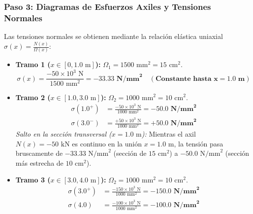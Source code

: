 \subsubsection*{Paso 3: Diagramas de Esfuerzos Axiles y Tensiones Normales}
Las tensiones normales se obtienen mediante la relación elástica uniaxial $\sigma(x) = \frac{N(x)}{\Omega(x)}$:
\begin{itemize}
    \item \textbf{Tramo 1 ($x \in [0, 1.0\text{ m}]$):} $\Omega_1 = 1500\text{ mm}^2 = 15\text{ cm}^2$.
    \begin{equation}
        \sigma(x) = \frac{-50 \times 10^3\text{ N}}{1500\text{ mm}^2} = \mathbf{-33.33\text{ N/mm}^2 \quad (\text{Constante hasta } x=1.0\text{ m})}
    \end{equation}
    \item \textbf{Tramo 2 ($x \in [1.0, 3.0\text{ m}]$):} $\Omega_2 = 1000\text{ mm}^2 = 10\text{ cm}^2$.
    \begin{align}
        \sigma(1.0^+) & = \frac{-50 \times 10^3\text{ N}}{1000\text{ mm}^2} = \mathbf{-50.0\text{ N/mm}^2} \\
        \sigma(3.0^-) & = \frac{+50 \times 10^3\text{ N}}{1000\text{ mm}^2} = \mathbf{+50.0\text{ N/mm}^2}
    \end{align}
    \textit{Salto en la sección transversal ($x = 1.0\text{ m}$):} Mientras el axil $N(x) = -50\text{ kN}$ es continuo en la unión $x=1.0\text{ m}$, la tensión pasa bruscamente de $-33.33\text{ N/mm}^2$ (sección de $15\text{ cm}^2$) a $-50.0\text{ N/mm}^2$ (sección más estrecha de $10\text{ cm}^2$).
    \item \textbf{Tramo 3 ($x \in [3.0, 4.0\text{ m}]$):} $\Omega_2 = 1000\text{ mm}^2 = 10\text{ cm}^2$.
    \begin{align}
        \sigma(3.0^+) & = \frac{-150 \times 10^3\text{ N}}{1000\text{ mm}^2} = \mathbf{-150.0\text{ N/mm}^2} \\
        \sigma(4.0)   & = \frac{-100 \times 10^3\text{ N}}{1000\text{ mm}^2} = \mathbf{-100.0\text{ N/mm}^2}
    \end{align}
\end{itemize}

